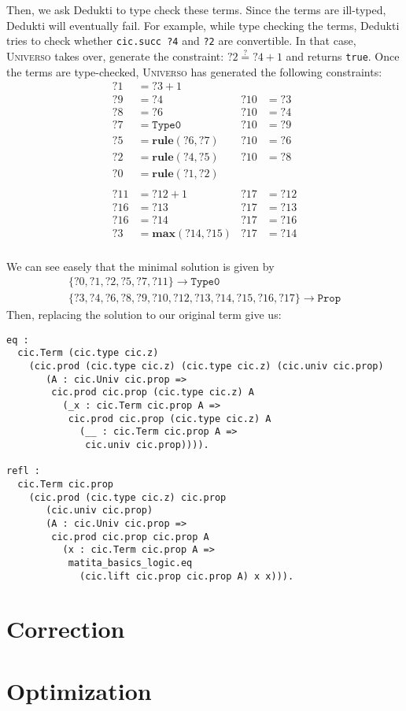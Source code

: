 \documentclass{article}
\newcommand{\universo}{\textsc{Universo}}
\begin{document}
Then, we ask Dedukti to type check these terms. Since the terms are ill-typed, Dedukti will eventually fail. For example, while type checking the terms, Dedukti tries to check whether \texttt{cic.succ ?4} and \texttt{?2} are convertible. In that case, \universo{} takes over, generate the constraint: \(?2 \stackrel{?}{=} ?4 + 1\) and returns \texttt{true}. Once the terms are type-checked, \universo{} has generated the following constraints:
\begin{align*}
  ?1 &= ?3 + 1 \\
  ?9 &= ?4     & ?10 &= ?3\\
  ?8 &= ?6     & ?10 &= ?4\\
  ?7 &= \mathtt{Type0} & ?10 &= ?9\\
  ?5 &= \mathbf{rule}(?6,?7)     & ?10 &= ?6\\
  ?2 &= \mathbf{rule}(?4,?5)     & ?10 &= ?8\\
  ?0 &= \mathbf{rule}(?1,?2)\\
  \\
  ?11 &= ?12 + 1 & ?17 &= ?12\\
  ?16 &= ?13 & ?17 &= ?13\\
  ?16 &= ?14 & ?17 &= ?16\\
  ?3 &= \mathbf{max}(?14,?15) & ?17 &= ?14\\
\end{align*}

We can see easely that the minimal solution is given by
\begin{align*}
  \{?0,?1,?2,?5,?7,?11\} \to \mathtt{Type0}\\
  \{?3,?4,?6,?8,?9,?10,?12, ?13, ?14, ?15, ?16, ?17\} \to \mathtt{Prop}
\end{align*}
Then, replacing the solution to our original term give us:

\begin{verbatim}
eq :
  cic.Term (cic.type cic.z)
    (cic.prod (cic.type cic.z) (cic.type cic.z) (cic.univ cic.prop)
       (A : cic.Univ cic.prop =>
        cic.prod cic.prop (cic.type cic.z) A
          (_x : cic.Term cic.prop A =>
           cic.prod cic.prop (cic.type cic.z) A
             (__ : cic.Term cic.prop A =>
              cic.univ cic.prop)))).

refl :
  cic.Term cic.prop
    (cic.prod (cic.type cic.z) cic.prop
       (cic.univ cic.prop)
       (A : cic.Univ cic.prop =>
        cic.prod cic.prop cic.prop A
          (x : cic.Term cic.prop A =>
           matita_basics_logic.eq
             (cic.lift cic.prop cic.prop A) x x))).
\end{verbatim}

\section{Correction}



\section{Optimization}
\end{document}
